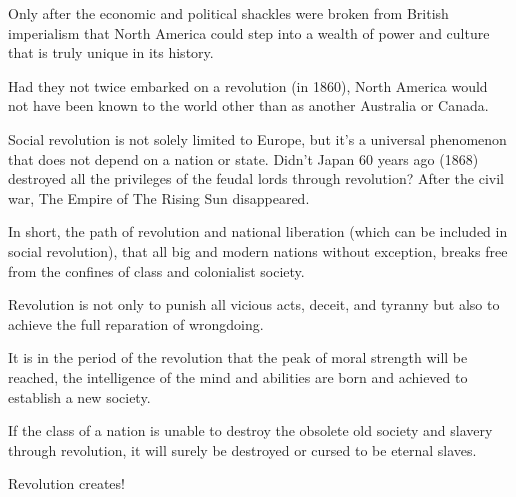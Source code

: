 Only after the economic and political shackles were broken from British imperialism that North America could step into 
a wealth of power and culture that is truly unique in its history.\vskip 0.2in

Had they not twice embarked on a revolution (in 1860), North America would not have been known to the 
world other than as another Australia or Canada.\vskip 0.2in

Social revolution is not solely limited to Europe, but it's a universal phenomenon that does not depend 
on a nation or state. Didn't Japan 60 years ago (1868) destroyed all the privileges of the feudal lords 
through revolution? After the civil war, The Empire of The Rising Sun disappeared.\vskip 0.2in

In short, the path of revolution and national liberation (which can be included in social revolution), 
that all big and modern nations without exception, breaks free from the confines of class and colonialist society.\vskip 0.2in

Revolution is not only to punish all vicious acts, deceit, and tyranny but also to achieve the full reparation of wrongdoing.\vskip 0.2in

It is in the period of the revolution that the peak of moral strength will be reached, the intelligence of the mind 
and abilities are born and achieved to establish a new society.\vskip 0.2in

If the class of a nation is unable to destroy the obsolete old society and slavery through revolution, 
it will surely be destroyed or cursed to be eternal slaves.\vskip 0.2in

Revolution creates!